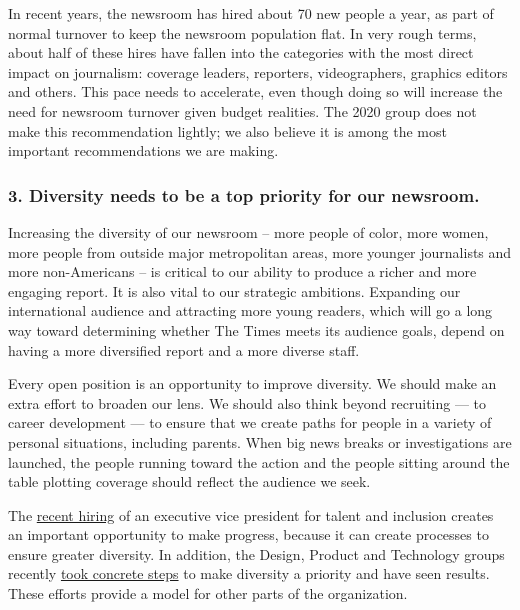 In recent years, the newsroom has hired about 70 new people a year, as
part of normal turnover to keep the newsroom population flat. In very
rough terms, about half of these hires have fallen into the categories
with the most direct impact on journalism: coverage leaders, reporters,
videographers, graphics editors and others. This pace needs to
accelerate, even though doing so will increase the need for newsroom
turnover given budget realities. The 2020 group does not make this
recommendation lightly; we also believe it is among the most important
recommendations we are making.

\hypertarget{3-diversity-needs-to-be-a-top-priority-for-our-newsroom}{%
\subsubsection{3. Diversity needs to be a top priority for our
newsroom.}\label{3-diversity-needs-to-be-a-top-priority-for-our-newsroom}}

Increasing the diversity of our newsroom -- more people of color, more
women, more people from outside major metropolitan areas, more younger
journalists and more non-Americans -- is critical to our ability to
produce a richer and more engaging report. It is also vital to our
strategic ambitions. Expanding our international audience and attracting
more young readers, which will go a long way toward determining whether
The Times meets its audience goals, depend on having a more diversified
report and a more diverse staff.

Every open position is an opportunity to improve diversity. We should
make an extra effort to broaden our lens. We should also think beyond
recruiting --- to career development --- to ensure that we create paths
for people in a variety of personal situations, including parents. When
big news breaks or investigations are launched, the people running
toward the action and the people sitting around the table plotting
coverage should reflect the audience we seek.

The
\href{http://investors.nytco.com/press/press-releases/press-release-details/2016/The-New-York-Times-Names-Ellen-Shultz-Executive-Vice-President-Talent-and-Inclusion/default.aspx}{recent
hiring} of an executive vice president for talent and inclusion creates
an important opportunity to make progress, because it can create
processes to ensure greater diversity. In addition, the Design, Product
and Technology groups recently
\href{http://www.nytco.com/a-note-from-kinsey-wilson-nytco-named-to-abis-2016-top-companies-for-women-technologists-leadership-index/}{took
concrete steps} to make diversity a priority and have seen results.
These efforts provide a model for other parts of the organization.

